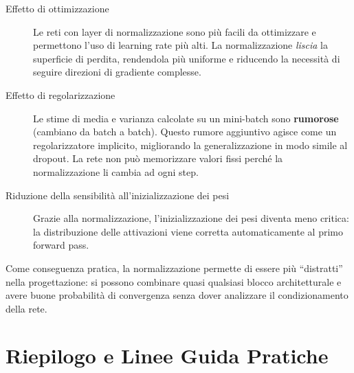 \begin{description}
  \item[Effetto di ottimizzazione] Le reti con layer di normalizzazione sono
        più facili da ottimizzare e permettono l'uso di learning rate più
        alti. La normalizzazione \emph{liscia} la superficie di perdita,
        rendendola più uniforme e riducendo la necessità di seguire
        direzioni di gradiente complesse.

  \item[Effetto di regolarizzazione] Le stime di media e varianza calcolate
        su un mini-batch sono \textbf{rumorose} (cambiano da batch a batch).
        Questo rumore aggiuntivo agisce come un regolarizzatore implicito,
        migliorando la generalizzazione in modo simile al dropout. La rete
        non può memorizzare valori fissi perché la normalizzazione li cambia
        ad ogni step.

  \item[Riduzione della sensibilità all'inizializzazione dei pesi] Grazie
        alla normalizzazione, l'inizializzazione dei pesi diventa meno
        critica: la distribuzione delle attivazioni viene corretta
        automaticamente al primo forward pass.
\end{description}

Come conseguenza pratica, la normalizzazione permette di essere più
``distratti'' nella progettazione: si possono combinare quasi qualsiasi
blocco architetturale e avere buone probabilità di convergenza senza dover
analizzare il condizionamento della rete.

\section{Riepilogo e Linee Guida Pratiche}
\label{sec:norm-summary}

